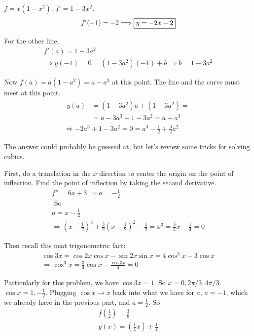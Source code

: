 \documentclass[twoside]{amsart}
\theoremstyle{plain}
\theoremstyle{definition}
\newcommand{\exercisehead}[1]
  {\smallskip
   \noindent{\small\bf Exercise #1.}}
\begin{document}
\exercisehead{8} $f = x(1-x^2)$.  $f'=1-3x^2$.  
\[
  f'(-1) = -2 \Longrightarrow \boxed{ y = -2x -2 } \\
\]

For the other line, 
\[
\begin{gathered}
  f'(a) = 1-3a^2 \\
  \Longrightarrow y(-1) = 0 = (1-3a^2)(-1)+b \,  \Longrightarrow b = 1-3a^2
\end{gathered}
\]

Now $f(a) = a(1-a^2) = a-a^3$ at this point.  The line and the curve must meet at this point.  
\[
\begin{gathered}
\begin{aligned}
  y(a) & = (1-3a^2)a + (1-3a^2) = \\
  & = a- 3a^3 + 1 -3a^2 = a-a^3 
\end{aligned} \\
\Longrightarrow -2a^3 + 1 -3a^2 = 0 = a^3 - \frac{1}{2} + \frac{3}{2} a^2 
\end{gathered}
\]

The answer could probably be guessed at, but let's review some tricks for solving cubics.  

First, do a translation in the $x$ direction to center the origin on the point of inflection.  Find the point of inflection by taking the second derivative.  
\[
\begin{gathered}
  f'' = 6a +3 \, \Longrightarrow a= -\frac{1}{2} \\
  \text{ So } \\
  a = x - \frac{1}{2}  \\
  \Longrightarrow (x- \frac{1}{2})^3 + \frac{3}{2} (x-\frac{1}{2} )^2 - \frac{1}{2} = x^3 = \frac{3}{4}x - \frac{1}{4} = 0 
\end{gathered}
\]

Then recall this neat trigonometric fact:
\[
\begin{gathered}
  \cos{3x} = \cos{2x} \cos{x} - \sin{2x} \sin{x} = 4 \cos^3{x} -3 \cos{x} \\
  \Longrightarrow \cos^3{x} = \frac{3}{4} \cos{x} - \frac{ \cos{3x}}{ 4} = 0 
\end{gathered}
\]

Particularly for this problem, we have $\cos{3x} =1$.  So $x = 0, 2\pi/3, 4\pi/3$.  $\cos{x} = 1, -\frac{1}{2}$.  Plugging $\cos{x} \to x$ back into what we have for $a$, $a=-1$, which we already have in the previous part, and $a=\frac{1}{2}$.  So
\[
\begin{gathered}
  \boxed{ f\left( \frac{1}{2} \right) = \frac{3}{8} } \\
\boxed{   y(x) = \left( \frac{1}{4} x \right) + \frac{1}{4} }
\end{gathered}
\]
\end{document}
